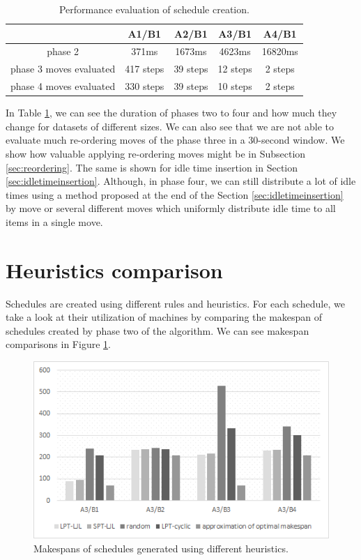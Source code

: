 \documentclass{ctuthesis}
\begin{document}
\begin{table}[H]
\begin{tabular}{ |c| c c c c|} 
\hline
 & A1/B1 & A2/B1 & A3/B1 & A4/B1\\ 
\hline
phase 2 & 371ms & 1673ms & 4623ms & 16820ms \\
\hline
phase 3 moves evaluated & 417 steps & 39 steps & 12 steps & 2 steps \\ 
\hline
phase 4 moves evaluated & 330 steps & 39 steps & 10 steps & 2 steps \\ 
\hline
\end{tabular}
\caption{Performance evaluation of schedule creation.} \label{tab:perform}
\end{table}

In Table \ref{tab:perform}, we can see the duration of phases two to four and how much they change for datasets of different sizes. We can also see that we are not able to evaluate much re-ordering moves of the phase three in a 30-second window. We show how valuable applying re-ordering moves might be in Subsection \ref{sec:reordering}. The same is shown for idle time insertion in Section \ref{sec:idletimeinsertion}. Although, in phase four, we can still distribute a lot of idle times using a method proposed at the end of the Section \ref{sec:idletimeinsertion} by move or several different moves which uniformly distribute idle time to all items in a single move.
\section{Heuristics comparison}
\label{sec:heuristiccomparison}
Schedules are created using different rules and heuristics. For each schedule, we take a look at their utilization of machines by comparing the makespan of schedules created by phase two of the algorithm. We can see makespan comparisons in Figure \ref{fig:c1}. 

\begin{figure}[H]
\includegraphics[width=\linewidth]{c1.png}
\caption{Makespans of schedules generated using different heuristics.}
\label{fig:c1}
\end{figure}
\end{document}
